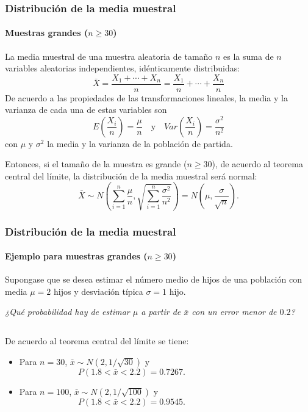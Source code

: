 \begin{frame}
\frametitle{Distribución de la media muestral}
\framesubtitle{Muestras grandes ($n\geq 30$)}
La media muestral de una muestra aleatoria de tamaño $n$ es la suma de $n$ variables aleatorias independientes, idénticamente distribuidas:
\[
\bar X = \frac{X_1+\cdots+X_n}{n} = \frac{X_1}{n}+\cdots+\frac{X_n}{n}
\]
De acuerdo a las propiedades de las transformaciones lineales, la media y la varianza de cada una de estas variables son
\[
E\left(\frac{X_i}{n}\right) =\frac{\mu}{n} \quad  \mbox{y} \quad Var\left(\frac{X_i}{n}\right) = \frac{\sigma^2}{n^2}
\]
con $\mu$ y $\sigma^2$ la media y la varianza de la población de partida.

Entonces, si el tamaño de la muestra es grande ($n\geq 30$), de acuerdo al teorema central del límite, la distribución de la media muestral será normal:
\[
\bar X \sim N\left(\sum_{i=1}^n \frac{\mu}{n},\sqrt{\sum_{i=1}^n \frac{\sigma^2}{n^2}} \right) = N\left(\mu,\frac{\sigma}{\sqrt{n}} \right).
\]
\end{frame}


\begin{frame}
\frametitle{Distribución de la media muestral}
\framesubtitle{Ejemplo para muestras grandes ($n\geq 30$)}
Supongase que se desea estimar el número medio de hijos de una población con media $\mu=2$ hijos y desviación típica $\sigma=1$ hijo.
\begin{center}
\emph{¿Qué probabilidad hay de estimar $\mu$ a partir de $\bar x$ con un error menor de $0.2$?}
\end{center}
\begin{columns}
\begin{column}{0.5\textwidth}
De acuerdo al teorema central del límite se tiene:
\begin{itemize}
\item Para $n=30$, $\bar x\sim N(2,1/\sqrt{30})$ y
\[
P(1.8<\bar x<2.2) = 0.7267.
\]

\item Para $n=100$, $\bar x\sim N(2,1/\sqrt{100})$ y
\[
P(1.8<\bar x<2.2) = 0.9545.
\]
\end{itemize}
\end{column}
\begin{column}{0.5\textwidth}
\begin{center}
\scalebox{0.7}{}
\end{center}
\end{column}
\end{columns}
\end{frame}


